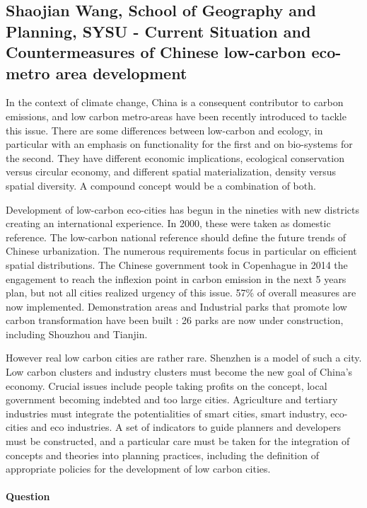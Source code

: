 \documentclass[10pt]{article}
\begin{document}
\subsection*{Shaojian Wang, School of Geography and Planning, SYSU - Current Situation and Countermeasures of Chinese low-carbon eco-metro area development}


In the context of climate change, China is a consequent contributor to carbon emissions, and low carbon metro-areas have been recently introduced to tackle this issue. There are some differences between low-carbon and ecology, in particular with an emphasis on functionality for the first and on bio-systems for the second. They have different economic implications, ecological conservation versus circular economy, and different spatial materialization, density versus spatial diversity. A compound concept would be a combination of both.

Development of low-carbon eco-cities has begun in the nineties with new districts creating an international experience. In 2000, these were taken as domestic reference. The low-carbon national reference should define the future trends of Chinese urbanization. The numerous requirements focus in particular on efficient spatial distributions. The Chinese government took in Copenhague in 2014 the engagement to reach the inflexion point in carbon emission in the next 5 years plan, but not all cities realized urgency of this issue. 57\% of overall measures are now implemented. Demonstration areas and Industrial parks that promote low carbon transformation have been built : 26 parks are now under construction, including Shouzhou and Tianjin.

However real low carbon cities are rather rare. Shenzhen is a model of such a city. Low carbon clusters and industry clusters must become the new goal of China's economy. Crucial issues include people taking profits on the concept, local government becoming indebted and too large cities. Agriculture and tertiary industries must integrate the potentialities of smart cities, smart industry, eco-cities and eco industries. A set of indicators to guide planners and developers must be constructed, and a particular care must be taken for the integration of concepts and theories into planning practices, including the definition of appropriate policies for the development of low carbon cities.

\paragraph{Question}
\end{document}
